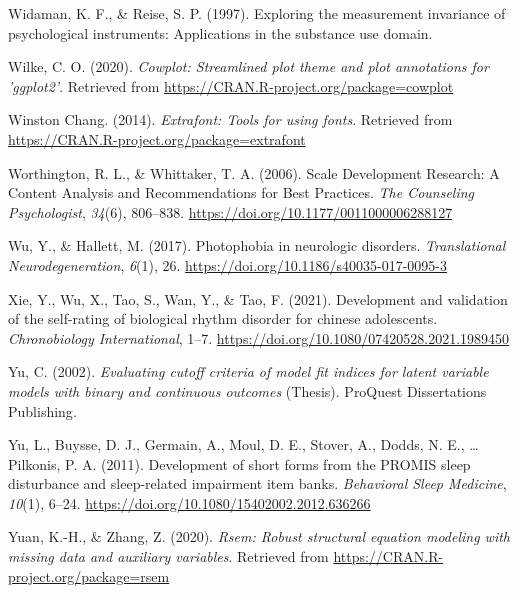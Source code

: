 \documentclass[
  english,
  man]{apa6}
\newlength{\cslhangindent}
\newlength{\cslentryspacingunit} %
\newenvironment{CSLReferences}[2] %
 {%
  \setlength{\parindent}{0pt}
  \ifodd #1
  \let\oldpar\par
  \def\par{\hangindent=\cslhangindent\oldpar}
  \fi
  \setlength{\parskip}{#2\cslentryspacingunit}
 }%
 {}
\begin{document}
\begin{CSLReferences}{1}{0}
\leavevmode{}%
Widaman, K. F., \& Reise, S. P. (1997). Exploring the measurement invariance of psychological instruments: Applications in the substance use domain.

\leavevmode{}%
Wilke, C. O. (2020). \emph{Cowplot: Streamlined plot theme and plot annotations for 'ggplot2'}. Retrieved from \url{https://CRAN.R-project.org/package=cowplot}

\leavevmode{}%
Winston Chang. (2014). \emph{Extrafont: Tools for using fonts}. Retrieved from \url{https://CRAN.R-project.org/package=extrafont}

\leavevmode{}%
Worthington, R. L., \& Whittaker, T. A. (2006). Scale {Development Research}: {A Content Analysis} and {Recommendations} for {Best Practices}. \emph{The Counseling Psychologist}, \emph{34}(6), 806--838. \url{https://doi.org/10.1177/0011000006288127}

\leavevmode{}%
Wu, Y., \& Hallett, M. (2017). Photophobia in neurologic disorders. \emph{Translational Neurodegeneration}, \emph{6}(1), 26. \url{https://doi.org/10.1186/s40035-017-0095-3}

\leavevmode{}%
Xie, Y., Wu, X., Tao, S., Wan, Y., \& Tao, F. (2021). Development and validation of the self-rating of biological rhythm disorder for chinese adolescents. \emph{Chronobiology International}, 1--7. \url{https://doi.org/10.1080/07420528.2021.1989450}

\leavevmode{}%
Yu, C. (2002). \emph{Evaluating cutoff criteria of model fit indices for latent variable models with binary and continuous outcomes} (Thesis). {ProQuest Dissertations Publishing}.

\leavevmode{}%
Yu, L., Buysse, D. J., Germain, A., Moul, D. E., Stover, A., Dodds, N. E., \ldots{} Pilkonis, P. A. (2011). Development of short forms from the PROMIS{\texttrademark} sleep disturbance and sleep-related impairment item banks. \emph{Behavioral Sleep Medicine}, \emph{10}(1), 6--24. \url{https://doi.org/10.1080/15402002.2012.636266}

\leavevmode{}%
Yuan, K.-H., \& Zhang, Z. (2020). \emph{Rsem: Robust structural equation modeling with missing data and auxiliary variables}. Retrieved from \url{https://CRAN.R-project.org/package=rsem}


\end{CSLReferences}
\end{document}
